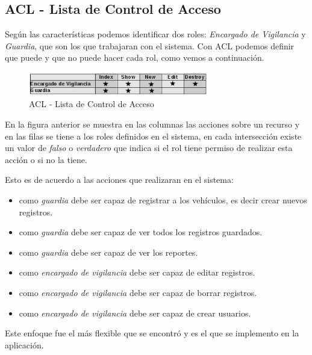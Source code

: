 \subsection{ACL - Lista de Control de Acceso}
Según las características podemos identificar dos roles: {\it Encargado de Vigilancia}
y {\it Guardia}, que son los que trabajaran con el sistema. Con ACL podemos definir
que puede y que no puede hacer cada rol, como vemos a continuación.

\vspace{1.0cm}

\begin{figure}[h]
  \begin{center}
  \includegraphics[width=0.7\textwidth]{figures/chapter4/acl.png}
  \caption[ACL - Roles del sistema]{ACL - Lista de Control de Acceso}
\end{center}
\end{figure}

\vspace{0.5cm}

En la figura anterior se muestra en las columnas las acciones sobre
un recurso y en las filas se tiene a los roles definidos en el sistema, en cada
intersección existe un valor de {\it falso} o {\it verdadero} que indica si el
rol tiene permiso de realizar esta acción o si no la tiene.

Esto es de acuerdo a las acciones que realizaran en el sistema:

\begin{itemize}
  \item como {\it guardia} debe ser capaz de registrar a los vehículos, es decir
    crear nuevos registros.
  \item como {\it guardia} debe ser capaz de ver todos los registros guardados.
  \item como {\it guardia} debe ser capaz de ver los reportes.
  \item como {\it encargado de vigilancia} debe ser capaz de editar registros.
  \item como {\it encargado de vigilancia} debe ser capaz de borrar registros.
  \item como {\it encargado de vigilancia} debe ser capaz de crear usuarios.
\end{itemize}

Este enfoque fue el más flexible que se encontró y es el que se implemento en la
aplicación.

